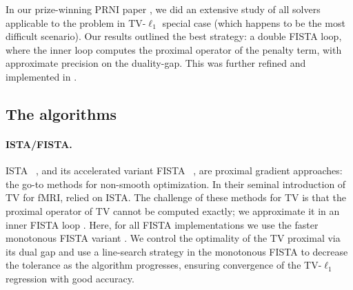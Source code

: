 In our prize-winning PRNI paper   \citep{dohmatob2014benchmarking}, we did an extensive study of all solvers applicable to the problem in TV-$\ell_1$ special case (which happens to be the most difficult scenario).
Our results outlined the best strategy: a double FISTA loop, where the
inner loop computes the proximal operator of the penalty term, with approximate precision on the duality-gap. This was further refined and implemented in   \citep{varoquaux2015faasta}.


\subsection{The algorithms}
\paragraph{ISTA/FISTA.}
ISTA~ \citep{daubechies2004}, and its accelerated variant
FISTA~ \citep{beck2009a}, are proximal gradient approaches: the go-to
methods for non-smooth optimization. In their seminal introduction of TV
for fMRI,  \citep{michel2011} relied on ISTA.
The challenge of these methods for TV is that the proximal operator
  of TV
cannot be computed exactly; we approximate it in an inner FISTA loop
 \citep{beck2009b,michel2011}.
Here, for all FISTA implementations we use
the faster monotonous FISTA variant  \citep{beck2009b}. We control the
optimality of the TV proximal via its dual gap  \citep{michel2011} and
use a line-search strategy in the monotonous FISTA to decrease the
tolerance as the algorithm progresses, ensuring convergence of the
TV-$\ell_1$ regression with good accuracy.


